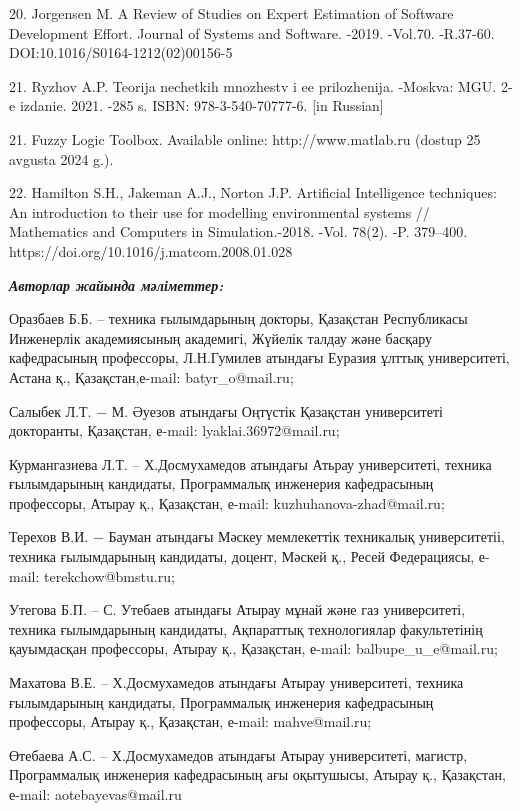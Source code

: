 \begin{noparindent}
20. Jorgensen M. A Review of Studies on Expert Estimation of Software
Development Effort. Journal of Systems and Software. -2019. -Vol.70.
-R.37-60. DOI:10.1016/S0164-1212(02)00156-5

21. Ryzhov A.P. Teorija nechetkih mnozhestv i ee prilozhenija. -Moskva:
MGU. 2-e izdanie. 2021. -285 s. ISBN: 978-3-540-70777-6. {[}in
Russian{]}

21. Fuzzy Logic Toolbox. Available online: http://www.matlab.ru (dostup
25 avgusta 2024 g.).

22. Hamilton S.H., Jakeman A.J., Norton J.P. Artificial Intelligence
techniques: An introduction to their use for modelling environmental
systems // Mathematics and Computers in Simulation.-2018. -Vol. 78(2).
-P. 379--400. https://doi.org/10.1016/j.matcom.2008.01.028
\end{noparindent}

\emph{{\bfseries Авторлар жайында мәліметтер:}}
\begin{noparindent}

Оразбаев Б.Б. -- техника ғылымдарының докторы, Қазақстан Республикасы
Инженерлік академиясының академигі, Жүйелік талдау және басқару
кафедрасының профессоры, Л.Н.Гумилев атындағы Еуразия ұлттық
университеті, Астана қ., Қазақстан,е-mail: batyr\_o@mail.ru;

Салыбек Л.Т. − М. Әуезов атындағы Оңтүстік Қазақстан университеті
докторанты, Қазақстан, е-mail: lyaklai.36972@mail.ru;

Курмангазиева Л.Т. -- Х.Досмухамедов атындағы Атьрау университеті,
техника ғылымдарының кандидаты, Программалық инженерия кафедрасының
профессоры, Атырау қ., Қазақстан, е-mail: kuzhuhanova-zhad@mail.ru;

Терехов В.И. − Бауман атындағы Мәскеу мемлекеттік техникалық
университетіі, техника ғылымдарының кандидаты, доцент, Мәскей қ., Ресей
Федерациясы, е-mail: terekchow@bmstu.ru;

Утегова Б.П. -- С. Утебаев атындағы Атырау мұнай және газ университеті,
техника ғылымдарының кандидаты, Ақпараттық технологиялар факультетінің
қауымдасқан профессоры, Атырау қ., Қазақстан, е-mail:
balbupe\_u\_e@mail.ru;

Махатова В.Е. -- Х.Досмухамедов атындағы Атырау университеті, техника
ғылымдарының кандидаты, Программалық инженерия кафедрасының профессоры,
Атырау қ., Қазақстан, е-mail: mahve@mail.ru;

Өтебаева А.С. -- Х.Досмухамедов атындағы Атырау университеті, магистр,
Программалық инженерия кафедрасының ағы оқытушысы, Атырау қ., Қазақстан,
е-mail: aotebayevas@mail.ru
\end{noparindent}

